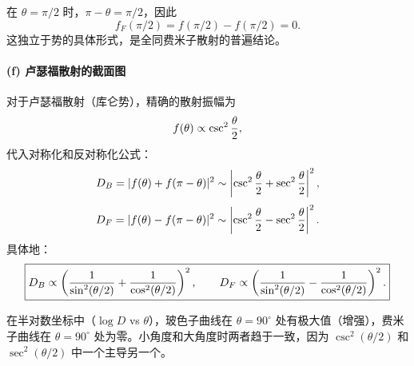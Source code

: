 \begin{solution}
在 $\theta=\pi/2$ 时，$\pi-\theta=\pi/2$，因此
\[
f_F(\pi/2)=f(\pi/2)-f(\pi/2)=0.
\]
这独立于势的具体形式，是全同费米子散射的普遍结论。

\paragraph{(f) 卢瑟福散射的截面图}

对于卢瑟福散射（库仑势），精确的散射振幅为
\[
f(\theta)\propto\csc^2{\theta\over2},
\]
代入对称化和反对称化公式：
\[
D_B=|f(\theta)+f(\pi-\theta)|^2\sim\left|\csc^2{\theta\over2}+\sec^2{\theta\over2}\right|^2,
\]
\[
D_F=|f(\theta)-f(\pi-\theta)|^2\sim\left|\csc^2{\theta\over2}-\sec^2{\theta\over2}\right|^2.
\]
具体地：
\[
\boxed{D_B\propto\left({1\over\sin^2(\theta/2)}+{1\over\cos^2(\theta/2)}\right)^2,
\qquad
D_F\propto\left({1\over\sin^2(\theta/2)}-{1\over\cos^2(\theta/2)}\right)^2.}
\]

在半对数坐标中（$\log D$ vs $\theta$），玻色子曲线在 $\theta=90^\circ$ 处有极大值（增强），费米子曲线在 $\theta=90^\circ$ 处为零。小角度和大角度时两者趋于一致，因为 $\csc^2(\theta/2)$ 和 $\sec^2(\theta/2)$ 中一个主导另一个。
\end{solution}

